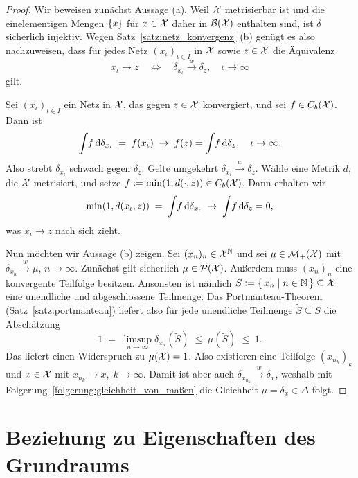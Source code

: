 \documentclass[../thesis/thesis.tex]{subfiles}
\begin{document}
	\begin{proof}
		Wir beweisen zunächst Aussage (a). Weil $\mathcal{X}$ metrisierbar ist und die einelementigen Mengen $\left\{x\right\}$ für $x \in \mathcal{X}$ daher in $\mathcal{B}(\mathcal{X})$ enthalten sind, ist $\delta$ sicherlich injektiv.
		Wegen Satz~\ref{satz:netz_konvergenz} (b) genügt es also nachzuweisen, dass für jedes Netz $(x_\iota)_{\iota \in I}$ in $\mathcal{X}$ sowie $z \in \mathcal{X}$ die Äquivalenz
		\[ x_\iota \to z \quad \iff \quad \delta_{x_\iota} \xrightarrow{w} \delta_z, \quad \iota \to \infty \]
		gilt. 
		
		Sei  $(x_\iota)_{\iota \in I}$ ein Netz in $\mathcal{X}$, das gegen $z \in \mathcal{X}$ konvergiert, und sei $f \in C_b(\mathcal{X})$. Dann ist
		\[ \int_{} \, f \, \mathrm{d}\delta_{x_\iota} \; = \; f(x_\iota) \; \to \; f(z) = \int_{} \, f \, \mathrm{d}\delta_{z}, \quad \iota \to \infty \text{.} \]
		Also strebt $\delta_{x_\iota}$ schwach gegen $\delta_z$. Gelte umgekehrt $\delta_{x_\iota} \xrightarrow{w} \delta_z$. Wähle eine Metrik $d$, die $\mathcal{X}$ metrisiert, und
		setze $f \vcentcolon = \min (1, d(\cdot, z)) \in C_b(\mathcal{X})$. Dann erhalten wir 
		\[ \min (1, d(x_\iota, z)) \; = \; \int_{} \, f \, \mathrm{d}\delta_{x_\iota} \; \to \; \int_{} \, f \, \mathrm{d}\delta_{z} = 0 \text{,} \]
		was $x_\iota \to z$ nach sich zieht.
		
		Nun möchten wir Aussage (b) zeigen. Sei $(x_n)_n \in \mathcal{X}^{\mathbb{N}}$ und sei $\mu \in \mathcal{M}_{+}(\mathcal{X})$ mit $\delta_{x_n} \xrightarrow{w} \mu$, $n \to \infty$. Zunächst gilt sicherlich $\mu \in \mathcal{P}(\mathcal{X})$.
		Außerdem muss $(x_n)_n$ eine konvergente Teilfolge besitzen. Ansonsten ist nämlich $S \vcentcolon = \left\{\, x_n \; \middle| \; n \in \mathbb{N} \,\right\} \subseteq \mathcal{X}$ eine unendliche und abgeschlossene Teilmenge. Das Portmanteau-Theorem (Satz~\ref{satz:portmanteau}) liefert also für jede unendliche Teilmenge $\tilde{S} \subseteq S$ die Abschätzung
		\[ 1 \; = \; \limsup_{n \to \infty} \delta_{x_n}(\tilde{S}) \; \leq \; \mu(\tilde{S}) \; \leq \; 1 \text{.} \]
		Das liefert einen Widerspruch zu $\mu(\mathcal{X}) = 1$. Also existieren eine Teilfolge $(x_{n_k})_k$ und $x \in \mathcal{X}$ mit $x_{n_k} \to x, \; k \to \infty$. Damit ist aber auch $\delta_{x_{n_k}} \xrightarrow{w} \delta_x$, weshalb mit
		Folgerung~\ref{folgerung:gleichheit_von_maßen} die Gleichheit $\mu = \delta_x \in \Delta$ folgt.
	\end{proof}

	\section{Beziehung zu Eigenschaften des Grundraums}
	\label{subsec:beziehung_zu_eigenschaften_des_grundraums}
	
\end{document}

